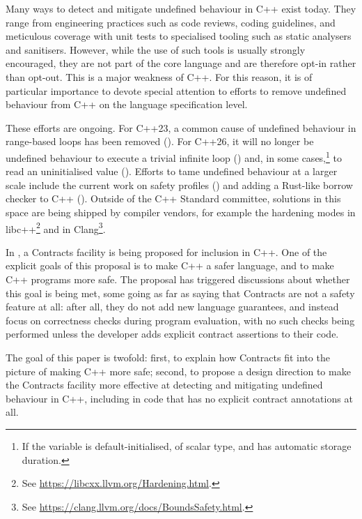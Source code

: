 Many ways to detect and mitigate undefined behaviour in C++ exist today. They range from engineering practices such as code reviews, coding guidelines, and meticulous coverage with unit tests to specialised tooling such as static analysers and sanitisers. However, while the use of such tools is usually strongly encouraged, they are not part of the core language and are therefore opt-in rather than opt-out. This is a major weakness of C++. For this reason, it is of particular importance to devote special attention to efforts to remove undefined behaviour from C++ on the language specification level.

These efforts are ongoing. For C++23, a common cause of undefined behaviour in range-based  loops has been removed (\cite{P2012R2}). For C++26, it will no longer be undefined behaviour to execute a trivial infinite loop (\cite{P2809R3}) and, in some cases,\footnote{If the  variable is default-initialised, of scalar type, and has automatic storage duration.} to read an uninitialised value (\cite{P2795R5}). Efforts to tame undefined behaviour at a larger scale include the current work on safety profiles (\cite{P3274R0}) and adding a Rust-like borrow checker to C++ (\cite{P3390R0}). Outside of the C++ Standard committee, solutions in this space are being shipped by compiler vendors, for example the hardening modes in libc++\footnote{See \href{https://libcxx.llvm.org/Hardening.html}{https://libcxx.llvm.org/Hardening.html}.} and  in Clang\footnote{See \href{https://clang.llvm.org/docs/BoundsSafety.html}{https://clang.llvm.org/docs/BoundsSafety.html}.}.

In \cite{P2900R9}, a Contracts facility is being proposed for inclusion in C++. One of the explicit goals of this proposal is to make C++ a safer language, and to make C++ programs more safe. The proposal has triggered discussions about whether this goal is being met, some going as far as saying that Contracts are not a safety feature at all: after all, they do not add new language guarantees, and instead focus on correctness checks during program evaluation, with no such checks being performed unless the developer adds explicit contract assertions to their code.

The goal of this paper is twofold: first, to explain how Contracts fit into the picture of making C++ more safe; second, to propose a design direction to make the Contracts facility more effective at detecting and mitigating undefined behaviour in C++, including in code that has no explicit contract annotations at all.

